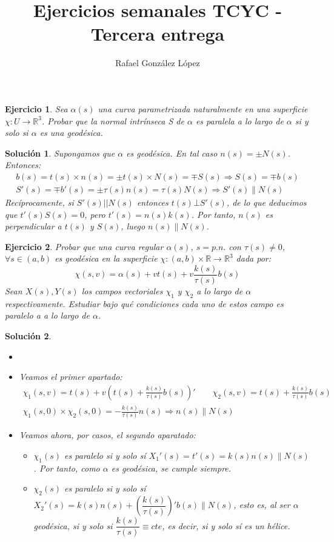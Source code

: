 \documentclass{article}
\theoremstyle{plain}
\newtheorem{exercise}{Ejercicio}
\newtheorem*{sol*}{Solución}
\newcommand{\R}{\mathbb{R}}
\newcommand{\X}{\chi}
\begin{document}
\title{Ejercicios semanales TCYC - Tercera entrega }
\author{Rafael González López}
\maketitle
\begin{exercise} Sea $\alpha(s)$ una curva parametrizada naturalmente en una superficie $\chi : U \rightarrow \R^3$. Probar
que la normal intrínseca S de $\alpha$ es paralela a lo largo de $\alpha$ si y solo si $\alpha$ es una geodésica.
\end{exercise}
\begin{sol*}
Supongamos que $\alpha$ es geodésica. En tal caso $n(s)=\pm N(s)$. Entonces:
\begin{gather*}
b(s) = t(s)\times n(s)= \pm t(s)\times N(s) = \mp S(s) \Rightarrow S(s)=\mp b(s)\\
S'(s) = \mp b'(s) = \pm \tau(s)n(s) = \tau(s) N(s) \Rightarrow S'(s) \parallel N(s)
\end{gather*}
Recíprocamente, si $S'(s)||N(s)$ entonces $t(s)\bot S'(s)$, de lo que deducimos que $t'(s)S(s)=0$, pero $t'(s) = n(s)k(s)$. Por tanto, $n(s)$ es perpendicular a $t(s)$ y $S(s)$, luego $n(s)\parallel N(s)$.
\end{sol*}


\newpage
\begin{exercise}Probar que una curva regular $\alpha(s)$, $s=p.n.$ con $\tau(s)\neq 0$, $\forall s\in (a,b)$ es geodésica en la superficie $\X:(a,b)\times\R \rightarrow\R^3$ dada por:
\[
\X(s,v)=\alpha(s)+v t(s) + v\frac{k(s)}{\tau(s)}b(s)
\]
Sean $X(s),Y(s)$ los campos vectoriales $\X_1$ y $\X_2$ a lo largo de $\alpha$ respectivamente. Estudiar bajo qué condiciones cada uno de estos campo es paralelo a a lo largo de $\alpha$.
\end{exercise}
\begin{sol*}
\begin{itemize}
\item[]
\item Veamos el primer apartado:
\begin{gather*}
\chi_1(s,v) = t(s) +v\left(t(s)+\frac{k(s)}{\tau(s)}b(s)\right)' \qquad \chi_2(s,v) = t(s)+\frac{k(s)}{\tau(s)}b(s)\\
\X_1(s,0)\times\X_2(s,0) = -\frac{k(s)}{\tau(s)}n(s) \Rightarrow n(s) \parallel N(s)
\end{gather*}
\item Veamos ahora, por casos, el segundo aparatado:
\begin{itemize}
\item $\chi_1(s)$ es paralelo si y solo sí $X_1'(s) = t'(s) = k(s)n(s) \parallel N(s)$. Por tanto, como $\alpha$ es geodésica, se cumple siempre.
\item $\chi_2(s)$ es paralelo si y solo sí $X_2'(s) = k(s)n(s)+\left(\dfrac{k(s)}{\tau(s)}\right)'b(s)\parallel N(s)$, esto es, al ser $\alpha$ geodésica, si y solo si $\dfrac{k(s)}{\tau(s)}\equiv cte$, es decir, si y solo sí es un hélice.
\end{itemize}
\end{itemize}
\end{sol*}
\end{document}

